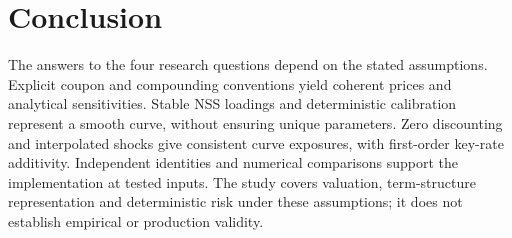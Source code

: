 \chapter{Conclusion}\label{ch:conclusion}
The answers to the four research questions depend on the stated assumptions. Explicit coupon and compounding conventions yield coherent prices and analytical sensitivities. Stable NSS loadings and deterministic calibration represent a smooth curve, without ensuring unique parameters. Zero discounting and interpolated shocks give consistent curve exposures, with first-order key-rate additivity. Independent identities and numerical comparisons support the implementation at tested inputs. The study covers valuation, term-structure representation and deterministic risk under these assumptions; it does not establish empirical or production validity.
